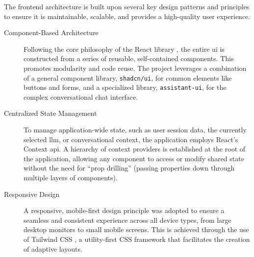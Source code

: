 The frontend architecture is built upon several key design patterns and principles to ensure it is maintainable, scalable, and provides a high-quality user experience.

\begin{description}
    \item[Component-Based Architecture] Following the core philosophy of the React library \cite{REACT}, the entire \acs{ui} is constructed from a series of reusable, self-contained components. This promotes modularity and code reuse. The project leverages a combination of a general component library, \texttt{shadcn/ui}, for common elements like buttons and forms, and a specialized library, \texttt{assistant-ui}, for the complex conversational chat interface.

    \item[Centralized State Management] To manage application-wide state, such as user session data, the currently selected \ac{llm}, or conversational context, the application employs React's Context \acs{api}. A hierarchy of context providers is established at the root of the application, allowing any component to access or modify shared state without the need for ``prop drilling'' (passing properties down through multiple layers of components).

    \item[Responsive Design] A responsive, mobile-first design principle was adopted to ensure a seamless and consistent experience across all device types, from large desktop monitors to small mobile screens. This is achieved through the use of Tailwind CSS \cite{TAILWIND-CSS}, a utility-first CSS framework that facilitates the creation of adaptive layouts.
\end{description}